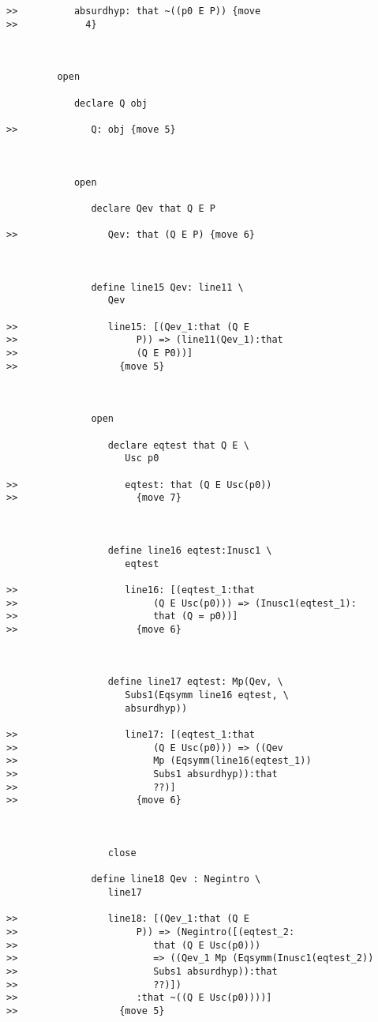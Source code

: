 \documentclass[12pt]{article}
\begin{document}
\begin{verbatim}
>>          absurdhyp: that ~((p0 E P)) {move
>>            4}



         open

            declare Q obj

>>             Q: obj {move 5}



            open

               declare Qev that Q E P

>>                Qev: that (Q E P) {move 6}



               define line15 Qev: line11 \
                  Qev

>>                line15: [(Qev_1:that (Q E
>>                     P)) => (line11(Qev_1):that
>>                     (Q E P0))]
>>                  {move 5}



               open

                  declare eqtest that Q E \
                     Usc p0

>>                   eqtest: that (Q E Usc(p0))
>>                     {move 7}



                  define line16 eqtest:Inusc1 \
                     eqtest

>>                   line16: [(eqtest_1:that
>>                        (Q E Usc(p0))) => (Inusc1(eqtest_1):
>>                        that (Q = p0))]
>>                     {move 6}



                  define line17 eqtest: Mp(Qev, \
                     Subs1(Eqsymm line16 eqtest, \
                     absurdhyp))

>>                   line17: [(eqtest_1:that
>>                        (Q E Usc(p0))) => ((Qev
>>                        Mp (Eqsymm(line16(eqtest_1))
>>                        Subs1 absurdhyp)):that
>>                        ??)]
>>                     {move 6}



                  close

               define line18 Qev : Negintro \
                  line17

>>                line18: [(Qev_1:that (Q E
>>                     P)) => (Negintro([(eqtest_2:
>>                        that (Q E Usc(p0)))
>>                        => ((Qev_1 Mp (Eqsymm(Inusc1(eqtest_2))
>>                        Subs1 absurdhyp)):that
>>                        ??)])
>>                     :that ~((Q E Usc(p0))))]
>>                  {move 5}




\end{verbatim}
\end{document}
